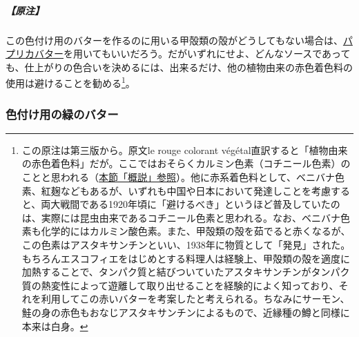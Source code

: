 \begin{recette}
\hypertarget{nota-beurre-colorant-rouge}{%
\subparagraph{【原注】}\label{nota-beurre-colorant-rouge}}

この色付け用のバターを作るのに用いる甲殻類の殻がどうしてもない場合は、\protect\hyperlink{beurre-de-paprika}{パプリカバター}を用いてもいいだろう。だがいずれにせよ、どんなソースであっても、仕上がりの色合いを決めるには、出来るだけ、他の植物由来の赤色着色料の使用は避けることを勧める\footnote{この原注は第三版から。原文le
  rouge colorant
  végétal直訳すると「植物由来の赤色着色料」だが。ここではおそらくカルミン色素（コチニール色素）のことと思われる（\protect\hyperlink{observation-sur-les-beurres-composes}{本節「概説」参照}）。他に赤系着色料として、ベニバナ色素、紅麹などもあるが、いずれも中国や日本において発達しことを考慮すると、両大戦間である1920年頃に「避けるべき」というほど普及していたのは、実際には昆虫由来であるコチニール色素と思われる。なお、ベニバナ色素も化学的にはカルミン酸色素。また、甲殻類の殻を茹でると赤くなるが、この色素はアスタキサンチンといい、1938年に物質として「発見」された。もちろんエスコフィエをはじめとする料理人は経験上、甲殻類の殻を適度に加熱することで、タンパク質と結びついていたアスタキサンチンがタンパク質の熱変性によって遊離して取り出せることを経験的によく知っており、それを利用してこの赤いバターを考案したと考えられる。ちなみにサーモン、鮭の身の赤色もおなじアスタキサンチンによるもので、近縁種の鱒と同様に本来は白身。}。

\hypertarget{beurre-colorant-vert}{%
\subsubsection{色付け用の緑のバター}\label{beurre-colorant-vert}}




\end{recette}
